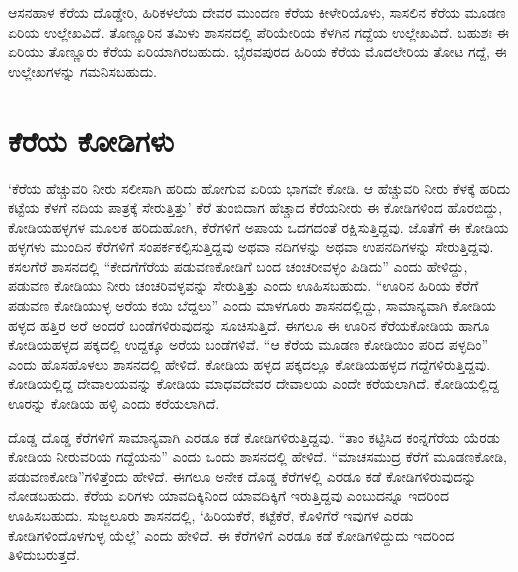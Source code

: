 ಆಸನಹಾಳ ಕೆರೆಯ ದೊಡ್ಡೇರಿ, ಹಿರಿಕಳಲೆಯ ದೇವರ ಮುಂದಣ ಕೆರೆಯ ಕೀಳೇರಿಯೊಳು, ಸಾಸಲಿನ ಕೆರೆಯ ಮೂಡಣ ಏರಿಯ ಉಲ್ಲೇಖವಿದೆ. ತೊಣ್ಣೂರಿನ ತಮಿಳು ಶಾಸನದಲ್ಲಿ ಪೆರಿಯೇರಿಯ ಕೆಳಗಿನ ಗದ್ದೆಯ ಉಲ್ಲೇಖವಿದೆ. ಬಹುಶಃ ಈ ಏರಿಯು ತೊಣ್ಣೂರು ಕೆರೆಯ ಏರಿಯಾಗಿರಬಹುದು. ಭೈರವಪುರದ ಹಿರಿಯ ಕೆರೆಯ ಮೊದಲೇರಿಯ ತೋಟ ಗದ್ದೆ, ಈ ಉಲ್ಲೇಖಗಳನ್ನು ಗಮನಿಸಬಹುದು.


\section{ಕೆರೆಯ ಕೋಡಿಗಳು}

‘ಕೆರೆಯ ಹೆಚ್ಚುವರಿ ನೀರು ಸಲೀಸಾಗಿ ಹರಿದು ಹೋಗುವ ಏರಿಯ ಭಾಗವೇ ಕೋಡಿ. ಆ ಹೆಚ್ಚುವರಿ ನೀರು ಕೆಳಕ್ಕೆ ಹರಿದು ಕಟ್ಟೆಯ ಕೆಳಗೆ ನದಿಯ ಪಾತ್ರಕ್ಕೆ ಸೇರುತ್ತಿತ್ತು’ ಕೆರೆ ತುಂಬಿದಾಗ ಹೆಚ್ಚಾದ ಕೆರೆಯನೀರು ಈ ಕೋಡಿಗಳಿಂದ ಹೊರಬಿದ್ದು, ಕೋಡಿಯಹಳ್ಳಗಳ ಮೂಲಕ ಹರಿದುಹೋಗಿ, ಕೆರೆಗಳಿಗೆ ಅಪಾಯ ಒದಗದಂತೆ ರಕ್ಷಿಸುತ್ತಿದ್ದವು. ಜೊತೆಗೆ ಈ ಕೋಡಿಯ ಹಳ್ಳಗಳು ಮುಂದಿನ ಕೆರೆಗಳಿಗೆ ಸಂಪರ್ಕಕಲ್ಪಿಸುತ್ತಿದ್ದವು ಅಥವಾ ನದಿಗಳನ್ನು ಅಥವಾ ಉಪನದಿಗಳನ್ನು ಸೇರುತ್ತಿದ್ದವು. ಕಸಲಗೆರೆ ಶಾಸನದಲ್ಲಿ “ಕೇದಗೆಗೆರೆಯ ಪಡುವಣಕೋಡಿಗೆ ಬಂದ ಚಂಚರೀವಳ್ಳಂ ಪಿಡಿದು” ಎಂದು ಹೇಳಿದ್ದು, ಪಡುವಣ ಕೋಡಿಯು ನೀರು ಚಂಚರಿವಳ್ಳವನ್ನು ಸೇರುತ್ತಿತ್ತು ಎಂದು ಊಹಿಸಬಹುದು. “ಊರಿನ ಹಿರಿಯ ಕೆರೆಗೆ ಪಡುವಣ ಕೋಡಿಯುಳ್ಳ ಅರೆಯ ಕಯಿ ಬೆದ್ದಲು” ಎಂದು ಮಾಳಗೂರು ಶಾಸನದಲ್ಲಿದ್ದು, ಸಾಮಾನ್ಯವಾಗಿ ಕೋಡಿಯ ಹಳ್ಳದ ಹತ್ತಿರ ಅರೆ ಅಂದರೆ ಬಂಡೆಗಳಿರುವುದನ್ನು ಸೂಚಿಸುತ್ತಿದೆ. ಈಗಲೂ ಈ ಊರಿನ ಕೆರೆಯಕೋಡಿಯ ಹಾಗೂ ಕೋಡಿಯಹಳ್ಳದ ಪಕ್ಕದಲ್ಲಿ ಉದ್ದಕ್ಕೂ ಅರೆಯ ಬಂಡೆಗಳಿವೆ. “ಆ ಕೆರೆಯ ಮೂಡಣ ಕೋಡಿಯಿಂ ಪರಿದ ಪಳ್ಳದಿಂ” ಎಂದು ಹೊಸಹೊಳಲು ಶಾಸನದಲ್ಲಿ ಹೇಳಿದೆ. ಕೋಡಿಯ ಹಳ್ಳದ ಪಕ್ಕದಲ್ಲೂ ಕೋಡಿಯಹಳ್ಳದ ಗದ್ದೆಗಳಿರುತ್ತಿದ್ದವು. ಕೋಡಿಯಲ್ಲಿದ್ದ ದೇವಾಲಯವನ್ನು ಕೋಡಿಯ ಮಾಧವದೇವರ ದೇವಾಲಯ ಎಂದೇ ಕರೆಯಲಾಗಿದೆ. ಕೋಡಿಯಲ್ಲಿದ್ದ ಊರನ್ನು ಕೋಡಿಯ ಹಳ್ಳಿ ಎಂದು ಕರೆಯಲಾಗಿದೆ.

ದೊಡ್ಡ ದೊಡ್ಡ ಕೆರೆಗಳಿಗೆ ಸಾಮಾನ್ಯವಾಗಿ ಎರಡೂ ಕಡೆ ಕೋಡಿಗಳಿರುತ್ತಿದ್ದವು. “ತಾಂ ಕಟ್ಟಿಸಿದ ಕಂನ್ನಗೆರೆಯ ಯೆರಡು ಕೋಡಿಯ ನೀರುವರಿಯ ಗದ್ದೆಯನು” ಎಂದು ಒಂದು ಶಾಸನದಲ್ಲಿ ಹೇಳಿದೆ. “ಮಾಚಸಮುದ್ರ ಕೆರೆಗೆ ಮೂಡಣಕೋಡಿ, ಪಡುವಣಕೋಡಿ”ಗಳಿತ್ತೆಂದು ಹೇಳಿದೆ. ಈಗಲೂ ಅನೇಕ ದೊಡ್ಡ ಕೆರೆಗಳಲ್ಲಿ ಎರಡೂ ಕಡೆ ಕೋಡಿಗಳಿರುವುದನ್ನು ನೋಡಬಹುದು. ಕೆರೆಯ ಏರಿಗಳು ಯಾವದಿಕ್ಕಿನಿಂದ ಯಾವದಿಕ್ಕಿಗೆ ಇರುತ್ತಿದ್ದವು ಎಂಬುದನ್ನೂ ಇದರಿಂದ ಊಹಿಸಬಹುದು. ಸುಜ್ಜಲೂರು ಶಾಸನದಲ್ಲಿ, ‘ಹಿರಿಯಕೆರೆ, ಕಟ್ಟೆಕೆರೆ, ಕೊಳಿಗೆರೆ ಇವುಗಳ ಎರಡು ಕೋಡಿಗಳಿಂದೊಳಗುಳ್ಳ ಯೆಲ್ಲೆ’ ಎಂದು ಹೇಳಿದೆ. ಈ ಕೆರೆಗಳಿಗೆ ಎರಡೂ ಕಡೆ ಕೋಡಿಗಳಿದ್ದುದು ಇದರಿಂದ ತಿಳಿದುಬರುತ್ತದೆ.

